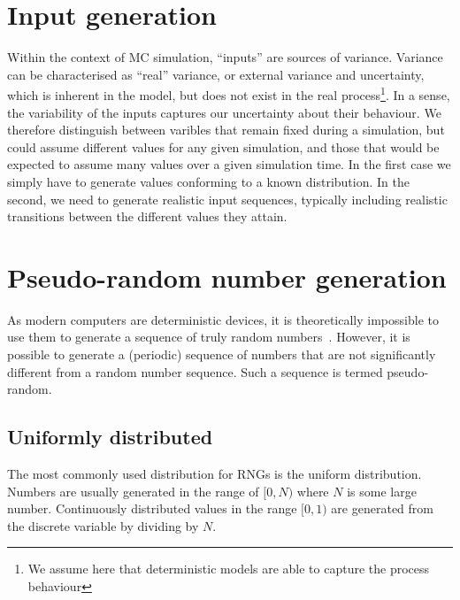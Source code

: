 \section{Input generation}
Within the context of MC simulation, ``inputs'' are sources of variance.
Variance can be characterised as ``real'' variance, or external variance and uncertainty, which is inherent in the model, but does not exist in the real process\footnote{We assume here that deterministic models are able to capture the
process behaviour}.  
In a sense, the variability of the inputs captures our uncertainty about their behaviour.  
We therefore distinguish between varibles that remain fixed during a simulation, but could assume different values for any given simulation, and those that would be expected to assume many values over a given simulation time.  
In the first case we simply have to generate values conforming to a known distribution.  
In the second, we need to generate realistic input sequences, typically including  realistic transitions between the different values they attain.


\section{Pseudo-random number generation}

As modern computers are deterministic devices, it is theoretically impossible to use them to generate a sequence of truly random numbers~\citep{neumann1951various}.
However, it is possible to generate a (periodic) sequence of numbers that are not significantly different from a random number sequence.
Such a sequence is termed pseudo-random.


\subsection{Uniformly distributed}
The most commonly used distribution for RNGs is the uniform distribution. 
Numbers are usually generated in the range of $[0, N)$ where $N$ is some large number.  
Continuously distributed values in the range $[0,1)$ are generated from the discrete variable by dividing  by  $N$.

